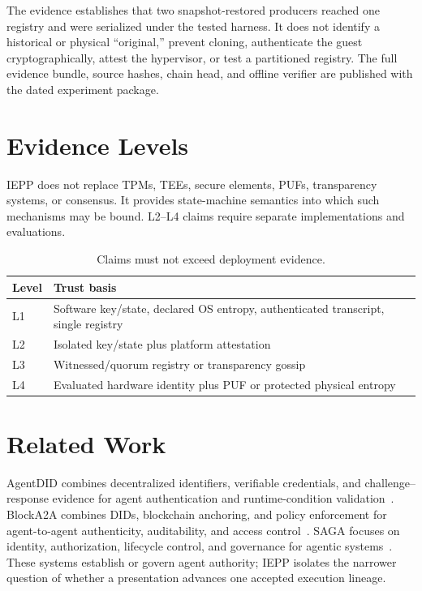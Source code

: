 \documentclass[11pt]{article}
\newcommand{\iepp}{\textsc{IEPP}}
\begin{document}
The evidence establishes that two snapshot-restored producers reached one registry and were serialized under the tested harness. It does not identify a historical or physical ``original,'' prevent cloning, authenticate the guest cryptographically, attest the hypervisor, or test a partitioned registry. The full evidence bundle, source hashes, chain head, and offline verifier are published with the dated experiment package.

\section{Evidence Levels}
\iepp{} does not replace TPMs, TEEs, secure elements, PUFs, transparency systems, or consensus. It provides state-machine semantics into which such mechanisms may be bound. L2--L4 claims require separate implementations and evaluations.

\begin{table}[h]
\centering
\caption{Claims must not exceed deployment evidence.}
\label{tab:levels}
\small
\begin{tabular}{p{}p{}}
\toprule
Level & Trust basis\\
\midrule
L1 & Software key/state, declared OS entropy, authenticated transcript, single registry\\
L2 & Isolated key/state plus platform attestation\\
L3 & Witnessed/quorum registry or transparency gossip\\
L4 & Evaluated hardware identity plus PUF or protected physical entropy\\
\bottomrule
\end{tabular}
\end{table}

\section{Related Work}
AgentDID combines decentralized identifiers, verifiable credentials, and challenge--response evidence for agent authentication and runtime-condition validation~\cite{xu2026agentdid}. BlockA2A combines DIDs, blockchain anchoring, and policy enforcement for agent-to-agent authenticity, auditability, and access control~\cite{zou2025blocka2a}. SAGA focuses on identity, authorization, lifecycle control, and governance for agentic systems~\cite{syros2025saga}. These systems establish or govern agent authority; \iepp{} isolates the narrower question of whether a presentation advances one accepted execution lineage.
\end{document}

